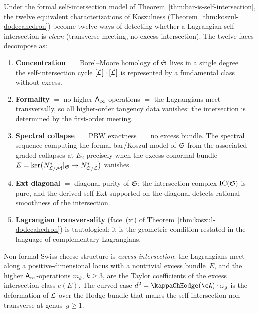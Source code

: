 \begin{corollary}
\label{cor:dodecahedron-lagrangian-singularity}
Under the formal self-intersection model of
Theorem~\textup{\ref{thm:bar-is-self-intersection}}, the twelve
equivalent characterizations of Koszulness
\textup{(}Theorem~\textup{\ref{thm:koszul-dodecahedron}}\textup{)}
become twelve ways of detecting whether a Lagrangian
self-intersection is \emph{clean} \textup{(}transverse meeting,
no excess intersection\textup{)}. The twelve faces decompose as:
\begin{enumerate}[label=\textup{(\roman*)},leftmargin=2em]
\item \textbf{Concentration} $=$ Borel--Moore homology of
 $\mathfrak{S}$ lives in a single degree $=$ the self-intersection
 cycle $[\mathcal L] \cdot [\mathcal L]$ is represented by a fundamental class
 without excess.
\item \textbf{Formality} $=$ no higher $\mathsf{A}_{\infty}$-operations $=$ the
 Lagrangians meet transversally, so all higher-order tangency
 data vanishes: the intersection is determined by the first-order
 meeting.
\item \textbf{Spectral collapse} $=$ PBW exactness $=$ no excess
 bundle. The spectral sequence computing
 the formal bar/Koszul model of $\mathfrak{S}$ from the associated
 graded collapses at $E_2$
 precisely when the excess conormal bundle
 $E = \ker\bigl(N^*_{\mathcal L/\mathcal M}|_{\mathfrak{S}} \to N^*_{\mathfrak{S}/\mathcal L}\bigr)$
 vanishes.
\item \textbf{Ext diagonal} $=$ diagonal purity of $\mathfrak{S}$:
 the intersection complex $\mathrm{IC}(\mathfrak{S})$ is pure,
 and the derived self-Ext supported on the diagonal detects
 rational smoothness of the intersection.
\item \textbf{Lagrangian transversality}
 \textup{(}face~\textup{(xi)} of
 Theorem~\textup{\ref{thm:koszul-dodecahedron}}\textup{)} is
 tautological: it is the geometric condition restated in
 the language of complementary Lagrangians.
\end{enumerate}
Non-formal Swiss-cheese structure is \emph{excess intersection}: the Lagrangians
meet along a positive-dimensional locus with a nontrivial excess
bundle~$E$, and the higher $\mathsf{A}_{\infty}$-operations $m_k$, $k \geq 3$,
are the Taylor coefficients of the excess intersection class
$e(E)$. The curved case $d^2 = \kappaChHodge(\cA)\cdot\omega_g$ is the
deformation of $\mathcal L$ over the Hodge bundle that makes the
self-intersection non-transverse at genus~$g \geq 1$.
\end{corollary}

